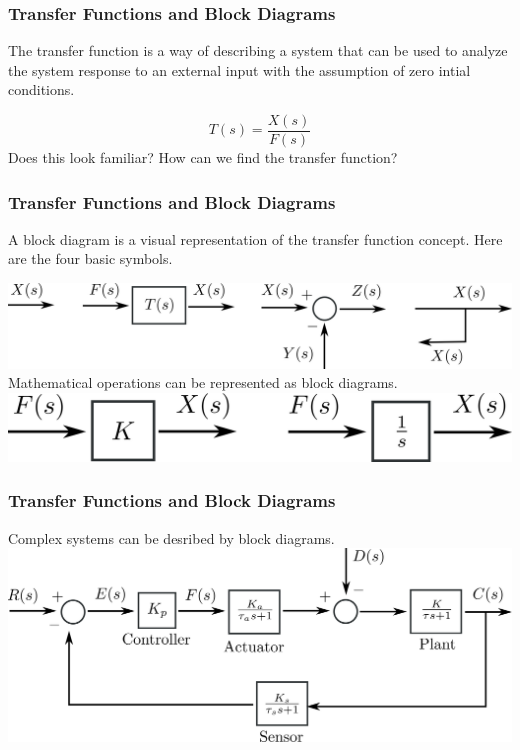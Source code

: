 \documentclass{beamer}                  %
\newcommand{\sectiontitleIII}{Transfer Functions and Block Diagrams}
\begin{document}
	\begin{frame}[label=sectionIII] \small
		\frametitle{\sectiontitleIII}
		\vspace{3mm}
		The transfer function is a way of describing a system that can be used to analyze the system response to an external input with the assumption of zero intial conditions.  

			
		\[ T(s)=\frac{X(s)}{F(s)} \]
		\vspace{10mm}
		Does this look familiar? How can we find the transfer function?		

		\btVFill
	\end{frame}	
	
	\begin{frame} \small
		\frametitle{\sectiontitleIII}
		\vspace{3mm}	
		A block diagram is a visual representation of the transfer function concept. Here are the four basic symbols.

		\vspace{5mm}

		\includegraphics[scale=.04]{four_basic_symbols.png} \vspace{2mm}\\

		Mathematical operations can be represented as block diagrams. \vspace{2mm}\\

		\includegraphics[scale=.04]{two_types_blocks.png}

		\btVFill
	\end{frame}	

	\begin{frame} \small
		\frametitle{\sectiontitleIII}

		Complex systems can be desribed by block diagrams. \vspace{5mm} \\
		
		\includegraphics[scale=0.04]{control_loop_example.png}

			
	\end{frame}	
\end{document}
